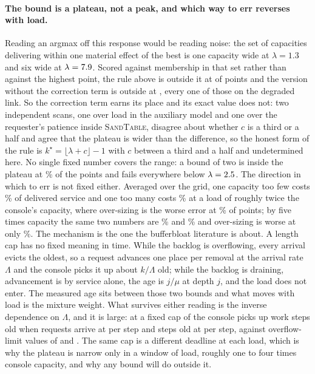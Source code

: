 \documentclass[11pt]{article}
\newcommand{\sandtable}{\textsc{SandTable}}
\begin{document}
\paragraph{The bound is a plateau, not a peak, and which way to err reverses with load.} Reading an argmax off this response would be reading noise: the set of capacities delivering within one material effect of the best is one capacity wide at $\lambda = 1.3$ and six wide at $\lambda = 7.9{}$. Scored against membership in that set rather than against the highest point, the rule above is outside it at \QcapHalfMiss{} of \QcapPoints{} points and the version without the correction term is outside at \QcapFloorMiss{}, every one of those on the degraded link. So the correction term earns its place and its exact value does not: two independent scans, one over load in the auxiliary model and one over the requester's patience inside \sandtable{}, disagree about whether $c$ is a third or a half and agree that the plateau is wider than the difference, so the honest form of the rule is $k^{\star} = \lfloor \lambda + c \rfloor - 1$ with $c$ between a third and a half and undetermined here. No single fixed number covers the range: a bound of two is inside the plateau at \QcapFixedTwoFrac\% of the points and fails everywhere below $\lambda = 2.5{}$. The direction in which to err is not fixed either. Averaged over the grid, one capacity too few costs \QcapUnderCostEight\% of delivered service and one too many costs \QcapOverCostEight\% at a load of roughly twice the console's capacity, where over-sizing is the worse error at \QcapOverWorseFracEight\% of points; by five times capacity the same two numbers are \QcapUnderCostTwentyfour\% and \QcapOverCostTwentyfour\% and over-sizing is worse at only \QcapOverWorseFracTwentyfour\%. The mechanism is the one the bufferbloat literature is about. A length cap has no fixed meaning in time. While the backlog is overflowing, every arrival evicts the oldest, so a request advances one place per removal at the arrival rate $\Lambda$ and the console picks it up about $k/\Lambda$ old; while the backlog is draining, advancement is by service alone, the age is $j/\mu$ at depth $j$, and the load does not enter. The measured age sits between those two bounds and what moves with load is the mixture weight. What survives either reading is the inverse dependence on $\Lambda$, and it is large: at a fixed cap of \QcapAgeK{} the console picks up work \QcapAgeLight{} steps old when requests arrive at \QcapAgeRateLight{} per step and \QcapAgeHeavy{} steps old at \QcapAgeRateHeavy{} per step, against overflow-limit values of \QcapAgeFlowLight{} and \QcapAgeFlowHeavy{}. The same cap is a different deadline at each load, which is why the plateau is narrow only in a window of load, roughly one to four times console capacity, and why any bound will do outside it.
\end{document}
